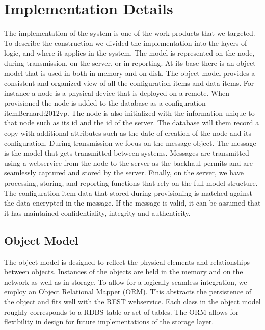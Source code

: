 \chapter{Implementation Details} The implementation of the system is one of the work products that we targeted. To describe the construction we divided the implementation into the layers of logic, and where it applies in the system.  The model is represented on the node, during transmission, on the server, or in reporting.  
At its base there is an object model that is used in both in memory and on disk.  The object model provides a consistent and organized view of all the configuration items and data items. For instance a node is a physical device that is deployed on a remote. When provisioned the node is added to the database as a configuration item{Bernard:2012vp}. The node is also initialized with the information unique to that node such as its id and the id of the server.  The database will them record a copy with additional attributes such as the date of creation of the node and its configuration.
During transmission we focus on the message object. The message is the model that gets transmitted between systems.  Messages are transmitted using a webservice from the node to the server as the backhaul permits and are seamlessly captured and stored by the server. 
Finally, on the server, we have processing, storing, and reporting functions that rely on the full model structure.  The configuration item data that stored during provisioning is matched against the data encrypted in the message. If the message is valid, it can be assumed that it has maintained confidentiality, integrity and authenticity. 

\section{Object Model}
The object model is designed to reflect the physical elements and relationships between objects. Instances of the objects are held in the memory and on the network as well as in storage. To allow for a logically seamless integration, we employ an Object Relational Mapper (ORM).  This abstracts the persistence of the object and fits well with the REST webservice.  Each class in the object model roughly corresponds to a RDBS table or set of tables. The ORM allows for flexibility in design for future implementations of the storage layer.  

